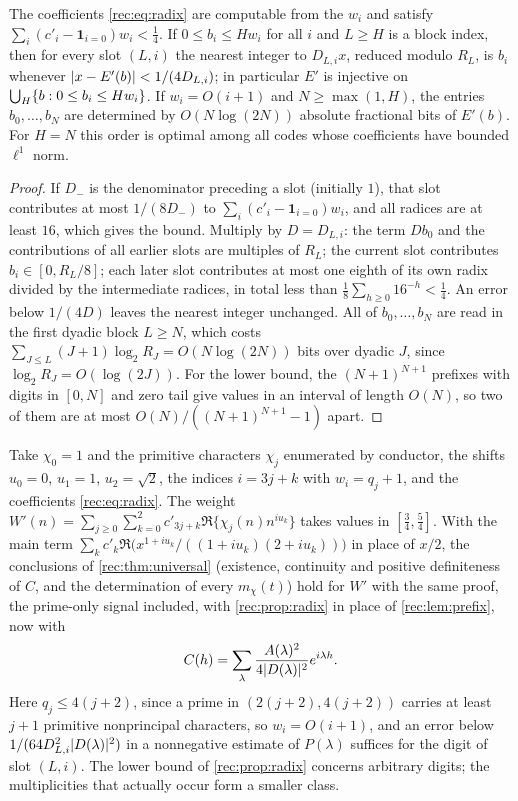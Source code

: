 \begin{proposition}\label{rec:prop:radix}
The coefficients \eqref{rec:eq:radix} are computable from the $w_i$ and satisfy
$\sum_i(c'_i-\mathbf 1_{i=0})w_i<\tfrac14$. If $0\le b_i\le Hw_i$ for all $i$ and $L\ge H$ is a block index, then for
every slot $(L,i)$ the nearest integer to $D_{L,i}x$, reduced modulo $R_L$, is $b_i$ whenever
$\lvert x-E'(b)\rvert<1/(4D_{L,i})$; in particular $E'$ is injective on $\bigcup_H\{b:0\le b_i\le Hw_i\}$. If
$w_i=O(i+1)$ and $N\ge\max(1,H)$, the entries $b_0,\dots,b_N$ are determined by $O(N\log(2N))$ absolute
fractional bits of $E'(b)$. For $H=N$ this order is optimal among all codes whose coefficients have
bounded $\ell^1$ norm.
\end{proposition}

\begin{proof}
If $D_-$ is the denominator preceding a slot (initially $1$), that slot contributes at most $1/(8D_-)$ to
$\sum_i(c'_i-\mathbf 1_{i=0})w_i$, and all radices are at least $16$, which gives the bound. Multiply by $D=D_{L,i}$:
the term $Db_0$ and the contributions of all earlier slots are multiples of $R_L$; the current slot
contributes $b_i\in[0,R_L/8]$; each later slot contributes at most one eighth of its own radix divided by
the intermediate radices, in total less than $\tfrac18\sum_{h\ge0}16^{-h}<\tfrac14$. An error below $1/(4D)$ leaves
the nearest integer unchanged. All of $b_0,\dots,b_N$ are read in the first dyadic block $L\ge N$, which
costs $\sum_{J\le L}(J+1)\log_2R_J=O(N\log(2N))$ bits over dyadic $J$, since $\log_2R_J=O(\log(2J))$. For the lower bound,
the $(N+1)^{N+1}$ prefixes with digits in $[0,N]$ and zero tail give values in an interval of length
$O(N)$, so two of them are at most $O(N)/((N+1)^{N+1}-1)$ apart.
\end{proof}

Take $\chi_0=1$ and the primitive characters $\chi_j$ enumerated by conductor, the shifts $u_0=0$, $u_1=1$,
$u_2=\sqrt2$, the indices $i=3j+k$ with $w_i=q_j+1$, and the coefficients \eqref{rec:eq:radix}. The weight
$W'(n)=\sum_{j\ge0}\sum_{k=0}^2c'_{3j+k}\Re\{\chi_j(n)n^{iu_k}\}$ takes values in $[\tfrac34,\tfrac54]$. With the main
term $\sum_kc'_k\Re\bigl(x^{1+iu_k}/((1+iu_k)(2+iu_k))\bigr)$ in place of $x/2$, the conclusions of
\cref{rec:thm:universal} (existence, continuity and positive definiteness of $C$, and the determination of every
$m_\chi(t)$) hold for $W'$ with the same proof, the prime-only signal included, with \cref{rec:prop:radix} in place
of \cref{rec:lem:prefix}, now with
\[
 C(h)=\sum_\lambda\frac{A(\lambda)^2}{4\lvert D(\lambda)\rvert^2}e^{i\lambda h}.
\]
Here $q_j\le4(j+2)$, since a prime in
$(2(j+2),4(j+2))$ carries at least $j+1$ primitive nonprincipal characters, so $w_i=O(i+1)$, and an error
below $1/(64D_{L,i}^2\lvert D(\lambda)\rvert^2)$ in a nonnegative estimate of $P(\lambda)$ suffices for the digit of slot $(L,i)$. The
lower bound of \cref{rec:prop:radix} concerns arbitrary digits; the multiplicities that actually occur form a
smaller class.


